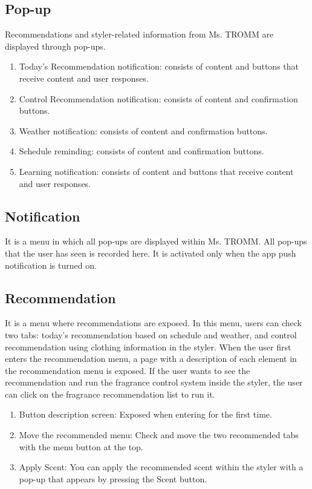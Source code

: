 \documentclass[conference]{IEEEtran}
\begin{document}
\subsection{Pop-up}
Recommendations and styler-related information from Ms. TROMM are displayed through pop-ups.\\
\begin{enumerate}
    \item Today's Recommendation notification: consists of content and buttons that receive content and user responses.\\
    \item Control Recommendation notification: consists of content and confirmation buttons.\\
    \item Weather notification: consists of content and confirmation buttons.\\
    \item Schedule reminding: consists of content and confirmation buttons. \\
    \item Learning notification: consists of content and buttons that receive content and user responses.\\
\end{enumerate}

\subsection{Notification}
It is a menu in which all pop-ups are displayed within Ms. TROMM. All pop-ups that the user has seen is recorded here. It is activated only when the app push notification is turned on.\\

\subsection{Recommendation}
It is a menu where recommendations are exposed. In this menu, users can check two tabs: today's recommendation based on schedule and weather, and control recommendation using clothing information in the styler. When the user first enters the recommendation menu, a page with a description of each element in the recommendation menu is exposed. If the user wants to see the recommendation and run the fragrance control system inside the styler, the user can click on the fragrance recommendation list to run it.\\
\begin{enumerate}
    \item Button description screen: Exposed when entering for the first time.\\
    \item Move the recommended menu: Check and move the two recommended tabs with the menu button at the top.\\
    \item Apply Scent: You can apply the recommended scent within the styler with a pop-up that appears by pressing the Scent button.\\
\end{enumerate}
\end{document}
